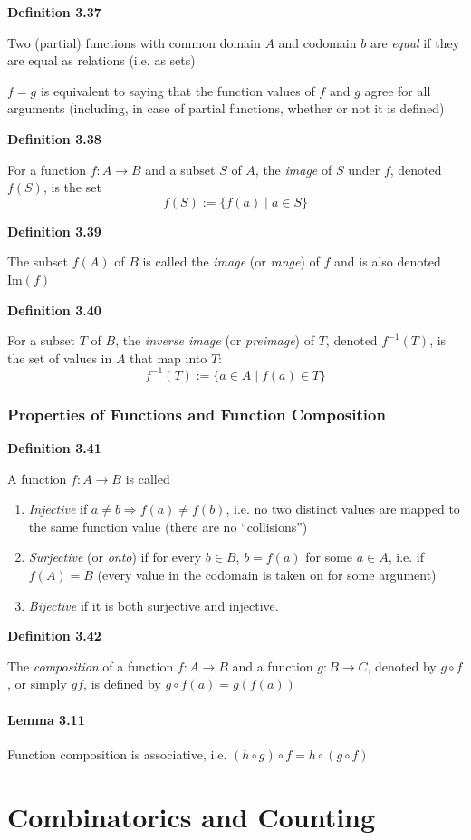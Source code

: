 \documentclass[a4paper]{report}
\newenvironment{definition}[1]{\begin{framed}\centerline{\textbf{Definition #1}}\noindent\hspace{-1.1mm}}{\end{framed}}
\begin{document}
\begin{definition}{3.37}
Two (partial) functions with common domain $A$ and codomain $b$ are \emph{equal} if they are equal as relations (i.e. as sets)
\end{definition}

$f=g$ is equivalent to saying that the function values of $f$ and $g$ agree for all arguments (including, in case of partial functions, whether or not it is defined)

\begin{definition}{3.38}
For a function $f:A\to B$ and a subset $S$ of $A$, the \emph{image} of $S$ under $f$, denoted $f(S)$, is the set \[f(S):=\{f(a)\mid a\in S\}\]
\end{definition}

\begin{definition}{3.39}
The subset $f(A)$ of $B$ is called the \emph{image} (or \emph{range}) of $f$ and is also denoted $\text{Im}(f)$
\end{definition}

\begin{definition}{3.40}
For a subset $T$ of $B$, the \emph{inverse image} (or \emph{preimage}) of $T$, denoted $f^{-1}(T)$, is the set of values in $A$ that map into $T$: \[f^{-1}(T):=\{a\in A\mid f(a)\in T\}\]
\end{definition}


\subsection{Properties of Functions and Function Composition}
\begin{definition}{3.41}
A function $f:A\to B$ is called
\begin{enumerate}
\item \emph{Injective} if $a\not=b\Rightarrow f(a)\not=f(b)$, i.e. no two distinct values are mapped to the same function value (there are no ``collisions'')
\item \emph{Surjective} (or \emph{onto}) if for every $b\in B$, $b=f(a)$ for some $a\in A$, i.e. if $f(A)=B$ (every value in the codomain is taken on for some argument)
\item \emph{Bijective} if it is both surjective and injective.  
\end{enumerate}
\end{definition}

\begin{definition}{3.42}
The \emph{composition} of a function $f:A\to B$ and a function $g:B\to C$, denoted by $g\circ f$, or simply $gf$, is defined by $g\circ f(a)=g\left( f(a)\right)$
\end{definition}

\subsubsection*{Lemma 3.11}
Function composition is associative, i.e. $(h\circ g)\circ f = h\circ (g\circ f)$

\chapter{Combinatorics and Counting}
\end{document}
